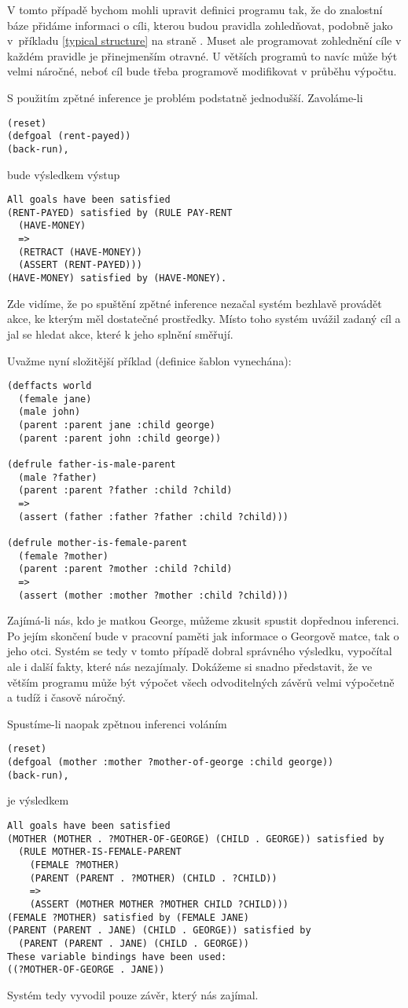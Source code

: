 V tomto případě bychom mohli upravit definici programu tak, že do znalostní báze
přidáme informaci o cíli, kterou budou pravidla zohledňovat, podobně jako
v~příkladu \ref{typical structure} na straně \pageref{typical structure}. Muset
ale programovat zohlednění cíle v každém pravidle je přinejmenším otravné. U
větších programů to navíc může být velmi náročné, neboť cíl bude třeba
programově modifikovat v průběhu výpočtu.

S použitím zpětné inference je problém podstatně jednodušší. Zavoláme-li
\begin{verbatim}
(reset)
(defgoal (rent-payed))
(back-run),
\end{verbatim}
bude výsledkem výstup
\begin{verbatim}
All goals have been satisfied
(RENT-PAYED) satisfied by (RULE PAY-RENT
  (HAVE-MONEY)
  =>
  (RETRACT (HAVE-MONEY))
  (ASSERT (RENT-PAYED)))
(HAVE-MONEY) satisfied by (HAVE-MONEY).
\end{verbatim}
Zde vidíme, že po spuštění zpětné inference nezačal systém bezhlavě provádět
akce, ke kterým měl dostatečné prostředky. Místo toho systém uvážil zadaný cíl a
jal se hledat akce, které k jeho splnění směřují.

Uvažme nyní složitější příklad (definice šablon vynechána):
\begin{verbatim}
(deffacts world
  (female jane)
  (male john)
  (parent :parent jane :child george)
  (parent :parent john :child george))

(defrule father-is-male-parent
  (male ?father)
  (parent :parent ?father :child ?child)
  =>
  (assert (father :father ?father :child ?child)))

(defrule mother-is-female-parent
  (female ?mother)
  (parent :parent ?mother :child ?child)
  =>
  (assert (mother :mother ?mother :child ?child)))
\end{verbatim}
Zajímá-li nás, kdo je matkou George, můžeme zkusit spustit dopřednou inferenci.
Po jejím skončení bude v pracovní paměti jak informace o Georgově matce, tak o
jeho otci. Systém se tedy v tomto případě dobral správného výsledku, vypočítal
ale i další fakty, které nás nezajímaly. Dokážeme si snadno představit, že ve
větším programu může být výpočet všech odvoditelných závěrů velmi výpočetně
a tudíž i časově náročný.

Spustíme-li naopak zpětnou inferenci voláním
\begin{verbatim}
(reset)
(defgoal (mother :mother ?mother-of-george :child george))
(back-run),
\end{verbatim}
je výsledkem
\begin{verbatim}
All goals have been satisfied
(MOTHER (MOTHER . ?MOTHER-OF-GEORGE) (CHILD . GEORGE)) satisfied by
  (RULE MOTHER-IS-FEMALE-PARENT
    (FEMALE ?MOTHER)
    (PARENT (PARENT . ?MOTHER) (CHILD . ?CHILD))
    =>
    (ASSERT (MOTHER MOTHER ?MOTHER CHILD ?CHILD)))
(FEMALE ?MOTHER) satisfied by (FEMALE JANE)
(PARENT (PARENT . JANE) (CHILD . GEORGE)) satisfied by
  (PARENT (PARENT . JANE) (CHILD . GEORGE))
These variable bindings have been used:
((?MOTHER-OF-GEORGE . JANE))
\end{verbatim}
Systém tedy vyvodil pouze závěr, který nás zajímal.

